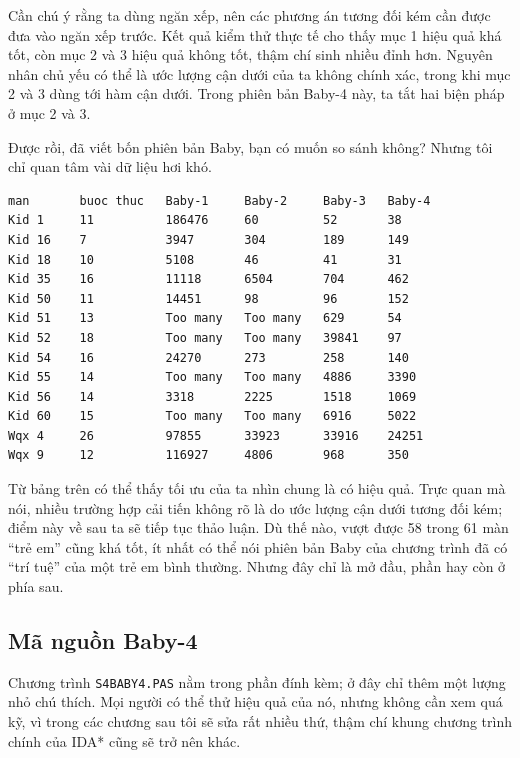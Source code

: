 \documentclass[11pt]{article}
\begin{document}
Cần chú ý rằng ta dùng ngăn xếp, nên các phương án tương đối kém cần được đưa
vào ngăn xếp trước. Kết quả kiểm thử thực tế cho thấy mục 1 hiệu quả khá tốt,
còn mục 2 và 3 hiệu quả không tốt, thậm chí sinh nhiều đỉnh hơn. Nguyên nhân
chủ yếu có thể là ước lượng cận dưới của ta không chính xác, trong khi mục 2
và 3 dùng tới hàm cận dưới. Trong phiên bản Baby-4 này, ta tắt hai biện pháp
ở mục 2 và 3.

Được rồi, đã viết bốn phiên bản Baby, bạn có muốn so sánh không? Nhưng tôi
chỉ quan tâm vài dữ liệu hơi khó.

\begin{verbatim}
man       buoc thuc   Baby-1     Baby-2     Baby-3   Baby-4
Kid 1     11          186476     60         52       38
Kid 16    7           3947       304        189      149
Kid 18    10          5108       46         41       31
Kid 35    16          11118      6504       704      462
Kid 50    11          14451      98         96       152
Kid 51    13          Too many   Too many   629      54
Kid 52    18          Too many   Too many   39841    97
Kid 54    16          24270      273        258      140
Kid 55    14          Too many   Too many   4886     3390
Kid 56    14          3318       2225       1518     1069
Kid 60    15          Too many   Too many   6916     5022
Wqx 4     26          97855      33923      33916    24251
Wqx 9     12          116927     4806       968      350
\end{verbatim}

Từ bảng trên có thể thấy tối ưu của ta nhìn chung là có hiệu quả. Trực quan
mà nói, nhiều trường hợp cải tiến không rõ là do ước lượng cận dưới tương đối
kém; điểm này về sau ta sẽ tiếp tục thảo luận. Dù thế nào, vượt được 58 trong
61 màn ``trẻ em'' cũng khá tốt, ít nhất có thể nói phiên bản Baby của chương
trình đã có ``trí tuệ'' của một trẻ em bình thường. Nhưng đây chỉ là mở đầu,
phần hay còn ở phía sau.

\subsection{Mã nguồn Baby-4}

Chương trình \texttt{S4BABY4.PAS} nằm trong phần đính kèm; ở đây chỉ thêm một
lượng nhỏ chú thích. Mọi người có thể thử hiệu quả của nó, nhưng không cần
xem quá kỹ, vì trong các chương sau tôi sẽ sửa rất nhiều thứ, thậm chí khung
chương trình chính của IDA* cũng sẽ trở nên khác.
\end{document}
